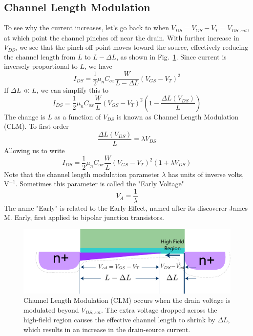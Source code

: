 \subsection{Channel Length Modulation} \label{sec:mos_clm}
To see why the current increases, let's go back to when $V_{DS} = V_{GS} - V_T = V_{DS,sat}$, at which point the channel pinches off near the drain. With further increase in $V_{DS}$, we see that the pinch-off point moves toward the source, effectively reducing the channel length from $L$ to $L-\Delta L$, as shown in Fig.~\ref{fig:mos_current_sat_clm}.  Since current is inversely proportional to $L$, we have
    \begin{equation} 
        I_{DS} = \frac{1}{2}{\mu _n}{C_{ox}}\frac{W}{{L - \Delta L}}{\left( {{V_{GS}} - {V_T}} \right)^2} 
    \end{equation}
If $\Delta L \ll L$, we can simplify this to 
    \begin{equation} 
        I_{DS} = \frac{1}{2}{\mu _n}{C_{ox}}\frac{W}{L}{\left( {{V_{GS}} - {V_T}} \right)^2}  \left(1 - \frac{\Delta L(V_{DS})}{L} \right)
    \end{equation}
The change is $L$ as a function of $V_{DS}$ is known as Channel Length Modulation (CLM).  To first order
    \begin{equation} 
        \frac{\Delta L(V_{DS})}{L} = \lambda V_{DS}
    \end{equation}
Allowing us to write
    \begin{equation} 
        I_{DS} = \frac{1}{2}{\mu _n}{C_{ox}}\frac{W}{L}{\left( {{V_{GS}} - {V_T}} \right)^2}\left( {1 + \lambda {V_{DS}}} \right) 
    \end{equation}
Note that the channel length modulation parameter $\lambda$ has units of inverse volts, $\mathrm{V^{-1}}$.  Sometimes this parameter is called the "Early Voltage" 
    \begin{equation} 
        V_A = \frac{1}{\lambda}
    \end{equation}
The name "Early" is related to the Early Effect, named after its discoverer James M. Early, first applied to bipolar junction transistors.  
\begin{figure}[tb]
\centering
\includegraphics[width=.75\columnwidth]{mos_current_sat_clm}
\caption{Channel Length Modulation (CLM) occurs when the drain voltage is modulated beyond $V_{DS,sat}$.  The extra voltage dropped across the high-field region causes the effective channel length to shrink by $\Delta L$, which results in an increase in the drain-source current.}
\label{fig:mos_current_sat_clm}
\end{figure}
